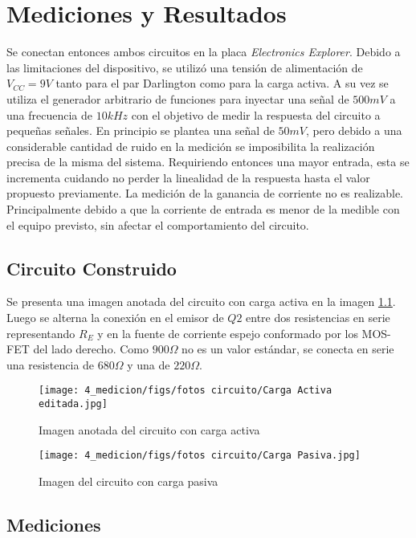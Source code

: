\chapter{Mediciones y Resultados}
Se conectan entonces ambos circuitos en la placa \textit{Electronics Explorer}. Debido a las limitaciones del dispositivo, se utilizó una tensión de alimentación de $V_{CC} = 9V$ tanto para el par Darlington como para la carga activa.
A su vez se utiliza el generador arbitrario de funciones para inyectar una señal de $500 mV$ a una frecuencia de $10kHz$ con el objetivo de medir la respuesta del circuito a pequeñas señales. En principio se plantea una señal de $50 mV$, pero debido a una considerable cantidad de ruido en la medición se imposibilita la realización precisa de la misma del sistema.
Requiriendo entonces una mayor entrada, esta se incrementa cuidando no perder la linealidad de la respuesta hasta el valor propuesto previamente.
La medición de la ganancia de corriente no es realizable. Principalmente debido a que la corriente de entrada es menor de la medible con el equipo previsto, sin afectar el comportamiento del circuito.

\section{Circuito Construido}
Se presenta una imagen anotada del circuito con carga activa en la imagen \ref{fig: foto circuito carga activa}. Luego se alterna la conexión en el emisor de $Q2$ entre dos resistencias en serie representando $R_E$ y en la fuente de corriente espejo conformado por los MOS-FET del lado derecho. Como $900 \Omega$ no es un valor estándar, se conecta en serie una resistencia de $680 \Omega$ y una de $220 \Omega$.

\begin{figure}[ht]
    \centering
    \texttt{[image: 4\_medicion/figs/fotos circuito/Carga Activa editada.jpg]}
    \caption{Imagen anotada del circuito con carga activa}\label{fig: foto circuito carga activa}
\end{figure}
\begin{figure}[ht]
    \centering
    \texttt{[image: 4\_medicion/figs/fotos circuito/Carga Pasiva.jpg]}
    \caption{Imagen del circuito con carga pasiva}\label{fig: foto circuito carga pasiva}
\end{figure}


\section{Mediciones}

